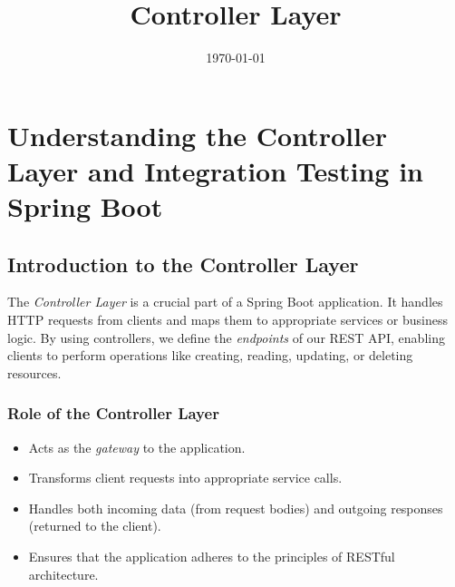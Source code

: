 \documentclass[a4paper,12pt]{article}
\title{Controller Layer}
\date{\today}
\begin{document}
\maketitle

\section{Understanding the Controller Layer and Integration Testing in Spring Boot}

\subsection{Introduction to the Controller Layer}
The \textit{Controller Layer} is a crucial part of a Spring Boot application. It handles HTTP requests from clients and maps them to appropriate services or business logic. By using controllers, we define the \textit{endpoints} of our REST API, enabling clients to perform operations like creating, reading, updating, or deleting resources.

\subsubsection{Role of the Controller Layer}
\begin{itemize}
    \item Acts as the \textit{gateway} to the application.
    \item Transforms client requests into appropriate service calls.
    \item Handles both incoming data (from request bodies) and outgoing responses (returned to the client).
    \item Ensures that the application adheres to the principles of RESTful architecture.
\end{itemize}
\end{document}
